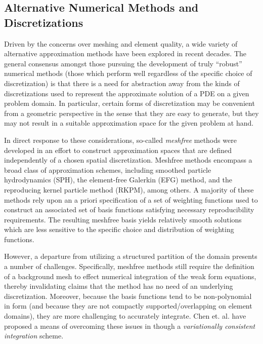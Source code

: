 	\subsection{Alternative Numerical Methods and Discretizations}
		Driven by the concerns over meshing and element quality, a wide variety of alternative approximation methods have been explored in recent decades. The general consensus amongst those pursuing the development of truly ``robust'' numerical methods (those which perform well regardless of the specific choice of discretization) is that there is a need for abstraction away from the kinds of discretizations used to represent the approximate solution of a PDE on a given problem domain. In particular, certain forms of discretization may be convenient from a geometric perspective in the sense that they are easy to generate, but they may not result in a suitable approximation space for the given problem at hand.
		
		In direct response to these considerations, so-called \textit{meshfree} methods were developed in an effort to construct approximation spaces that are defined independently of a chosen spatial discretization. Meshfree methods encompass a broad class of approximation schemes, including smoothed particle hydrodynamics (SPH), the element-free Galerkin (EFG) method, and the reproducing kernel particle method (RKPM), among others. A majority of these methods rely upon an a priori specification of a set of weighting functions used to construct an associated set of basis functions satisfying necessary reproducibility requirements. The resulting meshfree basis yields relatively smooth solutions which are less sensitive to the specific choice and distribution of weighting functions.
		
		However, a departure from utilizing a structured partition of the domain presents a number of challenges. Specifically, meshfree methods still require the definition of a background mesh to effect numerical integration of the weak form equations, thereby invalidating claims that the method has no need of an underlying discretization. Moreover, because the basis functions tend to be non-polynomial in form (and because they are not compactly supported/overlapping on element domains), they are more challenging to accurately integrate. Chen et. al. have proposed a means of overcoming these issues in \cite{Chen:13} though a \textit{variationally consistent integration} scheme.
		
